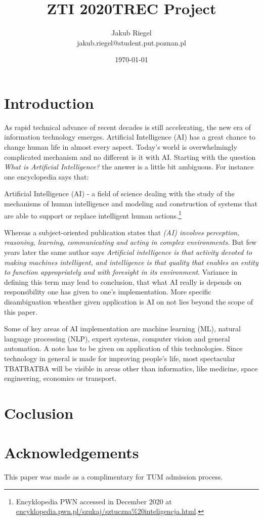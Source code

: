 \documentclass[10pt, a4paper, twocolumn]{article}
\title{ZTI 2020\newline TREC Project }
\date{\today }
\author{Jakub Riegel \\ jakub.riegel@student.put.poznan.pl }
\begin{document}
	\maketitle
	
	\begin{abstract}
		\lipsum[2]
	\end{abstract}
	
	\section{Introduction}
		As rapid technical advance of recent decades is still accelerating, the new era of information technology emerges. Artificial Intelligence (AI) has a great chance to change human life in almost every aspect. Today's world is overwhelmingly complicated mechanism and no different is it with AI. Starting with the question \emph{What is Artificial Intelligence?} the answer is a little bit ambiguous. For instance one encyclopedia says that:
		
		\begin{displayquote}
			Artificial Intelligence (AI) - a field of science dealing with the study of the mechanisms of human intelligence  and modeling and construction of systems that are able to support or replace intelligent human actions.\footnote{Encyklopedia PWN accessed in December 2020 at \href{https://encyklopedia.pwn.pl/szukaj/sztuczna\%20inteligencja.html}{encyklopedia.pwn.pl/szukaj/sztuczna\%20inteligencja.html}.}
		\end{displayquote}

		Whereas a subject-oriented publication \cite{newsynthesis} states that \emph{(AI) involves perception, reasoning, learning, communicating and acting in complex environments}. But few years later \cite{thequest} the same author says \emph{Artificial intelligence is that activity devoted to making machines intelligent, and intelligence is that quality that enables an entity to function appropriately and with foresight in its environment}. Variance in defining this term may lead to conclusion, that what AI really is depends on responsibility one has given to one's implementation\cite{ai100}. More specific disambiguation wheather given application is AI on not lies beyond the scope of this paper.
		
		Some of key areas of AI implementation are machine learning (ML), natural language processing (NLP), expert systems, computer vision and general automation. A note has to be given on application of this technologies. Since technology in general is made for improving people's life, most spectacular TBATBATBA will be visible in areas other than informatics, like medicine, space engineering, economics or transport. 
		
	\section{Coclusion}
		\lipsum[4]
	
	\section*{Acknowledgements}
	This paper was made as a complimentary for TUM admission process.
	
	 
	
\end{document}
